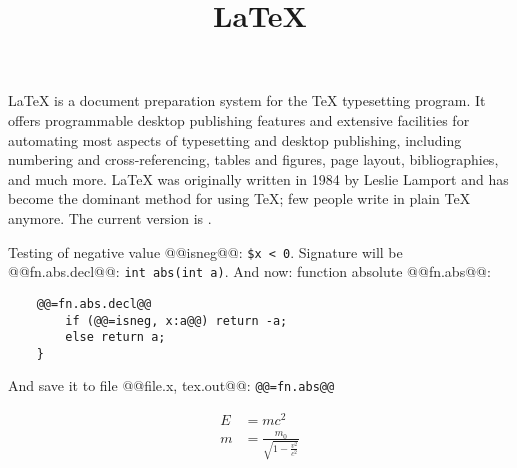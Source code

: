 \documentclass[12pt]{article}
\title{\LaTeX}
\date{}
\begin{document}
  \maketitle
  \LaTeX{} is a document preparation system for the \TeX{}
  typesetting program. It offers programmable desktop publishing
  features and extensive facilities for automating most aspects of
  typesetting and desktop publishing, including numbering and
  cross-referencing, tables and figures, page layout, bibliographies,
  and much more. \LaTeX{} was originally written in 1984 by Leslie
  Lamport and has become the dominant method for using \TeX; few
  people write in plain \TeX{} anymore. The current version is
  \LaTeXe.

  Testing of negative value @@isneg@@: \verb#$x < 0#. Signature will
  be @@fn.abs.decl@@: \verb!int abs(int a)!. And now:
  function absolute @@fn.abs@@:

  \begin{verbatim}
    @@=fn.abs.decl@@
        if (@@=isneg, x:a@@) return -a;
        else return a;
    }
  \end{verbatim}

  And save it to file @@file.x, tex.out@@: \verb!@@=fn.abs@@! 

  \begin{align}
    E &= mc^2                              \\
    m &= \frac{m_0}{\sqrt{1-\frac{v^2}{c^2}}}
  \end{align}
\end{document}
